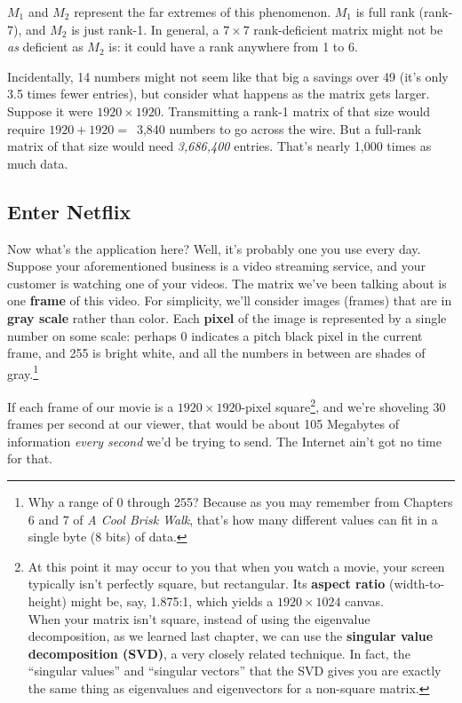 \begin{alttitles}
\smallskip

$M_1$ and $M_2$ represent the far extremes of this phenomenon. $M_1$ is full
rank (rank-7), and $M_2$ is just rank-1. In general, a $7\times 7$
rank-deficient matrix might not be \textit{as} deficient as $M_2$ is: it could
have a rank anywhere from 1 to 6.

\smallskip

Incidentally, 14 numbers might not seem like that big a savings over 49 (it's
only 3.5 times fewer entries), but consider what happens as the matrix gets
larger. Suppose it were $1920\times 1920$. Transmitting a rank-1 matrix of that
size would require $1920+1920=$\ 3,840 numbers to go across the wire. But a
full-rank matrix of that size would need \textit{3,686,400} entries. That's
nearly 1,000 times as much data.

\subsection{Enter Netflix}


Now what's the application here? Well, it's probably one you use every day.
Suppose your aforementioned business is a video streaming service, and your
customer is watching one of your videos. The matrix we've been talking about is
one \textbf{frame} of this video. For simplicity, we'll consider images
(frames) that are in \textbf{gray scale} rather than color. Each \textbf{pixel}
of the image is represented by a single number on some scale: perhaps 0
indicates a pitch black pixel in the current frame, and 255 is bright white,
and all the numbers in between are shades of gray.\footnote{Why a range of 0
through 255? Because as you may remember from Chapters 6 and 7 of \textit{A
Cool Brisk Walk}, that's how many different values can fit in a single byte (8
bits) of data.}

If each frame of our movie is a $1920\times 1920$-pixel square\footnote{At this
point it may occur to you that when you watch a movie, your screen typically
isn't perfectly square, but rectangular. Its 
\textbf{aspect ratio} (width-to-height) might be, say, 1.875:1, which yields a
$1920\times 1024$ canvas. \\ \indent When your matrix isn't square, instead of using
the eigenvalue decomposition, as we learned last chapter, we can use the
 \textbf{singular value decomposition
(SVD)}, a very closely related technique. In fact, the ``singular values'' and
``singular vectors'' that the SVD gives you are exactly the same thing as
eigenvalues and eigenvectors for a non-square matrix.}, and we're shoveling 30
frames per second at our viewer, that would be about 105 Megabytes of
information \textit{every second} we'd be trying to send. The Internet
ain't got no time for that.


\end{alttitles}
